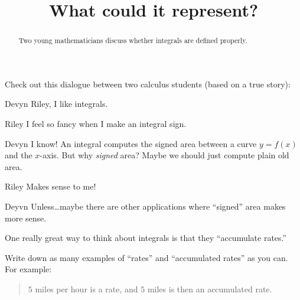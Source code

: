 \documentclass{ximera}
\title[Break-Ground:]{What could it represent?}
\begin{document}
\begin{abstract}
Two young mathematicians discuss whether integrals are defined properly.
\end{abstract}
\maketitle


Check out this dialogue between two calculus students (based on a true
story):

\begin{dialogue}
\item[Devyn] Riley, I like integrals.
\item[Riley] I feel so fancy when I make an integral sign.
\item[Devyn] I know! An integral computes the signed area between a curve
  $y=f(x)$ and the $x$-axis. But why \textit{signed} area? Maybe we should
  just compute plain old area.
\item[Riley] Makes sense to me!
\item[Deyvn] Unless\dots maybe there are other applications where
  ``signed'' area makes more sense.
\end{dialogue}

One really great way to think about integrals is that they
``accumulate rates.''

\begin{problem}
  Write down as many examples of ``rates'' and ``accumulated rates'' as you can. For example:
  \begin{quote}
    $5$ miles per hour is a rate, and $5$ miles is then an accumulated rate. 
  \end{quote}
  \begin{freeResponse}
  \end{freeResponse}
\end{problem}


\end{document}
